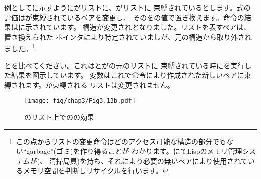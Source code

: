例としてに示すようにがリストに、がリストに
束縛されているとします。式の評価はが束縛されているペアを変更し、
そのをの値で置き換えます。命令の結果はに示されています。
構造が変更されとなりました。リストを表すペアは、置き換えられた
ポインタにより特定されていましが、元の構造から取り外されました。\footnote{
この点からリストの変更命令はどのアクセス可能な構造の部分でもない``garbage''(ゴミ)を作り得ることが
わかります。にてLispのメモリ管理システムが(、
清掃局員)を持ち、それにより必要の無いペアにより使用されているメモリ空間を判断しリサイクルを行います。}



とを比べてください。これはとがの元のリストに
束縛されている時にを実行した結果を図示しています。
変数はこれで命令により作成された新しいペアに束縛されます。が束縛される
リストは変更されません。


\begin{figure}[bp]
\label{Figure 3.13}
\centering
\begin{comment}
\heading{Figure 3.13:} Effect of \code{(set\-/car! x y)} on the lists in \link{Figure 3.12}.

\begin{example}
     +---+---+     +---+---+     +---+---+
x -->| * | *-+---->| * | *-+---->| * | / |
     +-|-+---+     +-|-+---+     +-|-+---+
       |             V             V
       |           +---+         +---+
       |           | c |         | d |
       |           +---+         +---+
       |           +---+---+     +---+---+
       |           | * | *-+---->| * | / |
       |           +-|-+---+     +-|-+---+
       |             V             V
       |           +---+         +---+
       |           | a |         | b |
       |           +---+         +---+
       +---------->+---+---+     +---+---+
                   | * | *-+---->| * | / |
              y -->+-|-+---+     +-|-+---+
                     V             V
                   +---+         +---+
                   | e |         | f |
                   +---+         +---+
\end{example}
\end{comment}
\texttt{[image: fig/chap3/Fig3.13b.pdf]}
\par\bigskip
\noindent
{} のリスト上でのの効果
\end{figure}


